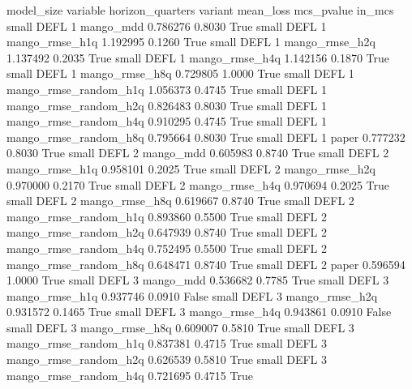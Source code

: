 model_size variable  horizon_quarters               variant  mean_loss  mcs_pvalue  in_mcs
     small     DEFL                 1             mango_mdd   0.786276      0.8030    True
     small     DEFL                 1        mango_rmse_h1q   1.192995      0.1260    True
     small     DEFL                 1        mango_rmse_h2q   1.137492      0.2035    True
     small     DEFL                 1        mango_rmse_h4q   1.142156      0.1870    True
     small     DEFL                 1        mango_rmse_h8q   0.729805      1.0000    True
     small     DEFL                 1 mango_rmse_random_h1q   1.056373      0.4745    True
     small     DEFL                 1 mango_rmse_random_h2q   0.826483      0.8030    True
     small     DEFL                 1 mango_rmse_random_h4q   0.910295      0.4745    True
     small     DEFL                 1 mango_rmse_random_h8q   0.795664      0.8030    True
     small     DEFL                 1                 paper   0.777232      0.8030    True
     small     DEFL                 2             mango_mdd   0.605983      0.8740    True
     small     DEFL                 2        mango_rmse_h1q   0.958101      0.2025    True
     small     DEFL                 2        mango_rmse_h2q   0.970000      0.2170    True
     small     DEFL                 2        mango_rmse_h4q   0.970694      0.2025    True
     small     DEFL                 2        mango_rmse_h8q   0.619667      0.8740    True
     small     DEFL                 2 mango_rmse_random_h1q   0.893860      0.5500    True
     small     DEFL                 2 mango_rmse_random_h2q   0.647939      0.8740    True
     small     DEFL                 2 mango_rmse_random_h4q   0.752495      0.5500    True
     small     DEFL                 2 mango_rmse_random_h8q   0.648471      0.8740    True
     small     DEFL                 2                 paper   0.596594      1.0000    True
     small     DEFL                 3             mango_mdd   0.536682      0.7785    True
     small     DEFL                 3        mango_rmse_h1q   0.937746      0.0910   False
     small     DEFL                 3        mango_rmse_h2q   0.931572      0.1465    True
     small     DEFL                 3        mango_rmse_h4q   0.943861      0.0910   False
     small     DEFL                 3        mango_rmse_h8q   0.609007      0.5810    True
     small     DEFL                 3 mango_rmse_random_h1q   0.837381      0.4715    True
     small     DEFL                 3 mango_rmse_random_h2q   0.626539      0.5810    True
     small     DEFL                 3 mango_rmse_random_h4q   0.721695      0.4715    True
